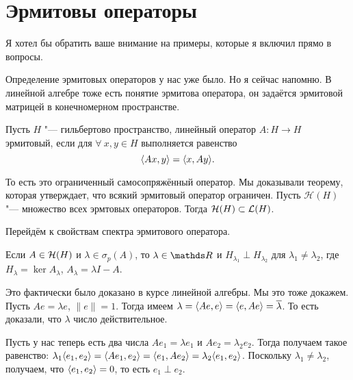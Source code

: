 \section{Эрмитовы операторы}
Я хотел бы обратить ваше внимание на примеры, которые я включил прямо в вопросы.

Определение эрмитовых операторов у нас уже было. Но я сейчас напомню.
В линейной алгебре тоже есть понятие эрмитова оператора, он задаётся эрмитовой матрицей в конечномерном пространстве.

\begin{Def}
Пусть $H$ "--- гильбертово пространство, линейный оператор $A\colon H\to H$ эрмитовый, если для $\forall\ x,y\in H$ выполняется равенство
\[
  \langle Ax,y\rangle = \langle x,Ay\rangle.
\]
\end{Def}
То есть это ограниченный самосопряжённый оператор. Мы доказывали теорему, которая утверждает, что всякий эрмитовый оператор ограничен. Пусть $\mathcal H(H)$ "--- множество всех эрмтовых операторов. Тогда $\mathcal H(H)\subset\mathcal L(H)$.

Перейдём к свойствам спектра эрмитового оператора.
\begin{Ut}
  Если $A\in\mathcal H(H)$ и $\lambda\in \sigma_p(A)$, то $\lambda\in\R$ и $H_{\lambda_1}\perp H_{\lambda_2}$ для $\lambda_1\ne \lambda_2$, где $H_\lambda = \ker A_\lambda$, $A_\lambda = \lambda I - A$.
\end{Ut}
\begin{Proof}
Это фактически было доказано в курсе линейной алгебры. Мы это тоже докажем. Пусть $Ae = \lambda e$, $\|e\| = 1$. Тогда имеем $\lambda  = \langle A e,e\rangle = \langle e, Ae\rangle = \overline{\lambda}$. То есть доказали, что $\lambda$ число действительное.

Пусть у нас теперь есть два числа $Ae_1 = \lambda e_1$ и $A e_2 = \lambda_2 e_2$.
Тогда получаем такое равенство: $\lambda_1\langle e_1,e_2\rangle = \langle Ae_1,e_2\rangle = \langle e_1,A e_2\rangle = \lambda_2 \langle e_1,e_2\rangle$. Поскольку $\lambda_1\ne \lambda_2$, получаем, что $\langle e_1,e_2\rangle=0$, то есть $e_1\perp e_2$.
\end{Proof}

